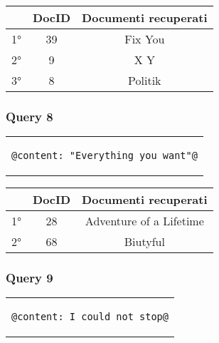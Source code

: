 \documentclass{article}
\begin{document}
\begin{table}[h!]
\centering
    \begin{tabular}{|c|c|c|}
    \hline
    & DocID & Documenti recuperati\\
    \hline
    1° & 39 & Fix You\\
    \hline
    2° & 9 & X Y\\
    \hline
    3° & 8 & Politik\\
    \hline
\end{tabular}
\end{table}

\subsubsection{Query 8}
\begin{center}
\begin{tabular}{c}
\begin{lstlisting}[style=prompt]
    @content: "Everything you want"@
\end{lstlisting}
\end{tabular}    
\end{center}

\begin{table}[h!]
\centering
    \begin{tabular}{|c|c|c|}
    \hline
    & DocID & Documenti recuperati\\
    \hline
    1° & 28 & Adventure of a Lifetime\\
    \hline
    2° & 68 & Biutyful\\
    \hline
\end{tabular}
\end{table}

\newpage
\subsubsection{Query 9}
\begin{center}
\begin{tabular}{c}
\begin{lstlisting}[style=prompt]
    @content: I could not stop@
\end{lstlisting}
\end{tabular}    
\end{center}
\end{document}
